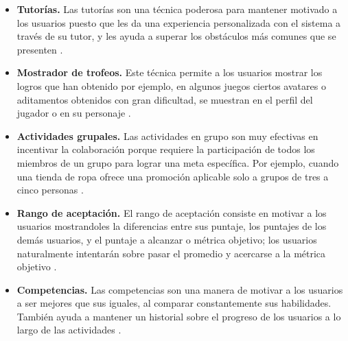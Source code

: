     \begin{itemize}
        
    \item
    {\bf Tutorías.}
        Las tutorías son una técnica poderosa para mantener motivado a los usuarios
        puesto que les da una experiencia personalizada con el sistema a través de su
        tutor, y les ayuda a superar los obstáculos más comunes que se presenten
        \cite[p. 215]{Octalysis}.
       
    \item
    {\bf Mostrador de trofeos.}
        Este técnica permite a los usuarios mostrar los logros que han obtenido
        por ejemplo, en algunos juegos ciertos avatares o aditamentos obtenidos con
        gran dificultad, se muestran en el perfil del jugador o en su personaje
        \cite[p. 218]{Octalysis}.
 
    \item
    {\bf Actividades grupales.}
        Las actividades en grupo son muy efectivas en incentivar la colaboración
        porque requiere la participación de todos los miembros de un grupo para
        lograr una meta específica. Por ejemplo, cuando una tienda de ropa ofrece
        una promoción aplicable solo a grupos de tres a cinco personas
        \cite[p. 221]{Octalysis}.
        
    \item
    {\bf Rango de aceptación.} %
        El rango de aceptación consiste en motivar a los usuarios mostrandoles
        la diferencias entre sus puntaje, los puntajes de los demás usuarios,
        y el puntaje a alcanzar o métrica objetivo; los usuarios naturalmente
        intentarán sobre pasar el promedio y acercarse a la métrica objetivo
        \cite[p. 226]{Octalysis}.
        
    \item
    {\bf Competencias.} 
        Las competencias son una manera de motivar a los usuarios a ser mejores
        que sus iguales, al comparar constantemente sus habilidades. También ayuda
        a mantener un historial sobre el progreso de los usuarios a lo largo de las
        actividades \cite[p. 210]{Octalysis}.
        
        
    \end{itemize}
    
